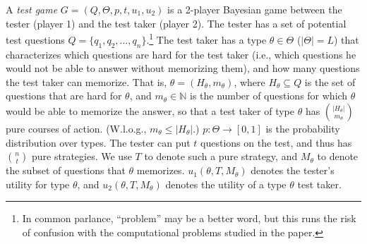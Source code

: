 \documentclass{article}
\begin{document}
A \emph{test game} $G = (Q, \Theta, p, t, u_1, u_2)$ is a 2-player
Bayesian game
between the tester (player 1) and the test taker (player 2). 
The tester has a set of potential test
questions $Q = \{q_1, q_2, \ldots, q_n\}$.\footnote{In common parlance,
  ``problem'' may be a better word, but this runs the risk of confusion
  with the computational problems studied in the paper.}
  The test taker has a type
$\theta \in \Theta$ ($|\Theta| = L$) that characterizes which questions
are hard for the test taker
 (i.e., which questions he would
not be able to answer without memorizing them), and how many questions the test
taker can memorize.  That is, $\theta = (H_\theta, m_\theta)$, where
$H_\theta \subseteq Q$ is the set of questions that are hard for $\theta$,
and $m_\theta \in \mathbb N$ is the number of questions for which $\theta$
would be able to memorize the answer, so that a test taker of type $\theta$
has $|H_\theta| \choose m_\theta$ pure courses of action.
(W.l.o.g., $m_\theta \leq |H_\theta|$.)
$p: \Theta \rightarrow [0,1]$ is the
probability distribution over types.
The tester can put $t$ questions on the test, and thus has $n \choose t$
pure strategies.  We use $T$ to denote such a pure strategy, and $M_\theta$
to denote the subset of questions that $\theta$ memorizes.  $u_1(\theta, T,
M_\theta)$ denotes the tester's utility for type $\theta$, and $u_2(\theta,
T, M_\theta)$ denotes the utility of a type $\theta$ 
test taker.
\end{document}
